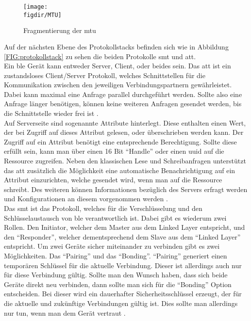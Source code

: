 \begin{figure}[h]
	\centering
	\texttt{[image: \\figdir/MTU]}
	\caption{Fragmentierung der \ac{mtu} \cite{TI:WWW}}
	\label{FIG:mtu}
\end{figure}

\noindent Auf der nächsten Ebene des Protokollstacks befinden sich wie in Abbildung \ref{FIG:protokollstack} zu sehen die beiden Protokolle \ac{smt} und \ac{att}.\\

\noindent Ein \ac{ble} Gerät kann entweder Server, Client, oder beides sein. Das \ac{att} ist ein zustandsloses Client/Server Protokoll, welches Schnittstellen für die Kommunikation zwischen den jeweiligen Verbindungspartnern gewährleistet. Dabei kann maximal eine Anfrage parallel durchgeführt werden. Sollte also eine Anfrage länger benötigen, können keine weiteren Anfragen gesendet werden, bis die Schnittstelle wieder frei ist \cite[Seite 26]{Townsend14:GSB}.\\

\noindent Auf Serverseite sind sogenannte Attribute hinterlegt. Diese enthalten einen Wert, der bei Zugriff auf dieses Attribut gelesen, oder überschrieben werden kann. Der Zugriff auf ein Attribut benötigt eine entsprechende Berechtigung. Sollte diese erfüllt sein, kann man über einen 16 Bit "`Handle"' oder einen \ac{uuid} auf die Ressource zugreifen. Neben den klassischen Lese und Schreibanfragen unterstützt das \ac{att} zusätzlich die Möglichkeit eine automatische Benachrichtigung auf ein Attribut einzurichten, welche gesendet wird, wenn man auf die Ressource schreibt. Des weiteren können Informationen bezüglich des Servers erfragt werden und Konfigurationen an diesem vorgenommen werden \cite[Seite 26ff]{Townsend14:GSB}.\\

\noindent Das \ac{smt} ist das Protokoll, welches für die Verschlüsselung und den Schlüsselaustausch von \ac{ble} verantwortlich ist. Dabei gibt es wiederum zwei Rollen. Den Initiator, welcher dem Master aus dem Linked Layer entspricht, und den "`Responder"', welcher dementsprechend dem Slave aus dem "`Linked Layer"' entspricht. Um zwei Geräte sicher miteinander zu verbinden gibt es zwei Möglichkeiten. Das "`Pairing"' und das "`Bonding"'. "`Pairing"' generiert einen temporären Schlüssel für die aktuelle Verbindung. Dieser ist allerdings auch nur für diese Verbindung gültig. Sollte man den Wunsch haben, dass sich beide Geräte direkt neu verbinden, dann sollte man sich für die "`Bonding"' Option entscheiden. Bei dieser wird ein dauerhafter Sicherheitsschlüssel erzeugt, der für die aktuelle und zukünftige Verbindungen gültig ist. Dies sollte man allerdings nur tun, wenn man dem Gerät vertraut \cite[Seite 28]{Townsend14:GSB}.\\

